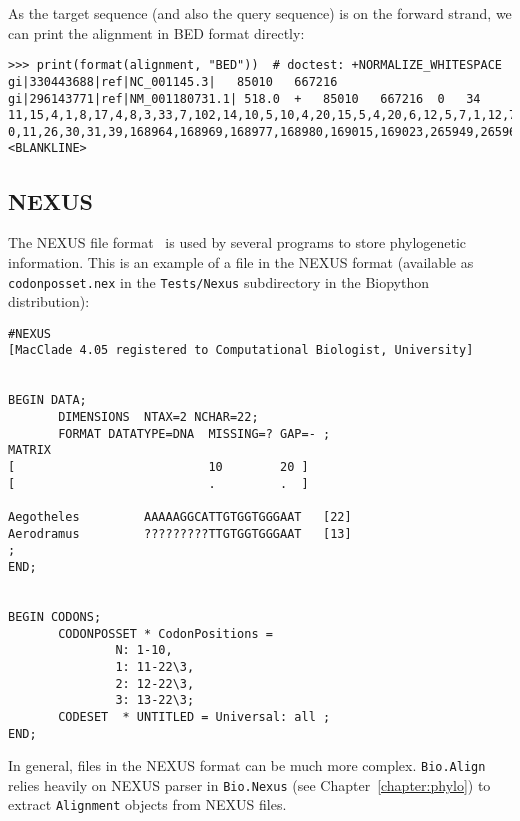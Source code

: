 As the target sequence (and also the query sequence) is on the forward strand, we can print the alignment in BED format directly:
\begin{verbatim}
>>> print(format(alignment, "BED"))  # doctest: +NORMALIZE_WHITESPACE
gi|330443688|ref|NC_001145.3|	85010	667216	gi|296143771|ref|NM_001180731.1| 518.0	+	85010	667216	0	34	11,15,4,1,8,17,4,8,3,33,7,102,14,10,5,10,4,20,15,5,4,20,6,12,5,7,1,12,75,6,4,2,3,41,	0,11,26,30,31,39,168964,168969,168977,168980,169015,169023,265949,265965,265975,265982,265992,265997,266017,266033,266038,388160,388185,582030,582044,582049,582058,582060,582072,582147,582153,582158,582161,582165,
<BLANKLINE>
\end{verbatim}


\subsection{NEXUS}
\label{subsec:align_nexus}

The NEXUS file format~\cite{maddison1997} is used by several programs to store phylogenetic information. This is an example of a file in the NEXUS format (available as \verb|codonposset.nex| in the \verb|Tests/Nexus| subdirectory in the Biopython distribution):
\begin{verbatim}
#NEXUS
[MacClade 4.05 registered to Computational Biologist, University]


BEGIN DATA;
       DIMENSIONS  NTAX=2 NCHAR=22;
       FORMAT DATATYPE=DNA  MISSING=? GAP=- ;
MATRIX
[                           10        20 ]
[                           .         .  ]

Aegotheles         AAAAAGGCATTGTGGTGGGAAT   [22]
Aerodramus         ?????????TTGTGGTGGGAAT   [13]
;
END;


BEGIN CODONS;
       CODONPOSSET * CodonPositions =
               N: 1-10,
               1: 11-22\3,
               2: 12-22\3,
               3: 13-22\3;
       CODESET  * UNTITLED = Universal: all ;
END;
\end{verbatim}
In general, files in the NEXUS format can be much more complex. \verb|Bio.Align| relies heavily on NEXUS parser in \verb|Bio.Nexus| (see Chapter~\ref{chapter:phylo}) to extract \verb|Alignment| objects from NEXUS files.

